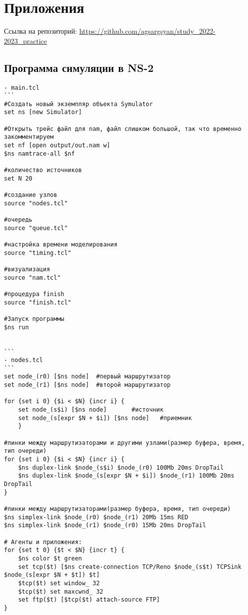 \chapter*{Приложения}

Ссылка на репозиторий: 
\url{https://github.com/agsargsyan/study_2022-2023_practice}


\section*{Программа симуляции в NS-2}

\begin{verbatim}
- main.tcl
```
#Создать новый экземпляр объекта Symulator
set ns [new Simulator]

#Открыть трейс файл для nam, файл слишком большой, так что временно закомментируем
set nf [open output/out.nam w]
$ns namtrace-all $nf

#количество источников 
set N 20

#создание узлов
source "nodes.tcl"

#очередь		
source "queue.tcl"

#настройка времени моделирования  		
source "timing.tcl" 		

#визуализация
source "nam.tcl"   		

#процедура finish
source "finish.tcl"                                                                         

#Запуск программы
$ns run

 
```
- nodes.tcl
```
set node_(r0) [$ns node]  #первый маршрутизатор
set node_(r1) [$ns node]  #второй маршрутизатор	

for {set i 0} {$i < $N} {incr i} {
	set node_(s$i) [$ns node] 		#источник
	set node_(s[expr $N + $i]) [$ns node]	#приемник
	}

#линки между маршрутизаторами и другими узлами(размер буфера, время, тип очереди)
for {set i 0} {$i < $N} {incr i} {
	$ns duplex-link $node_(s$i) $node_(r0) 100Mb 20ms DropTail
	$ns duplex-link $node_(s[expr $N + $i]) $node_(r1) 100Mb 20ms DropTail
}

#линки между маршрутизаторами(размер буфера, время, тип очереди)
$ns simplex-link $node_(r0) $node_(r1) 20Mb 15ms RED
$ns simplex-link $node_(r1) $node_(r0) 15Mb 20ms DropTail

# Агенты и приложения:
for {set t 0} {$t < $N} {incr t} {
	$ns color $t green
	set tcp($t) [$ns create-connection TCP/Reno $node_(s$t) TCPSink $node_(s[expr $N + $t]) $t]
	$tcp($t) set window_ 32
	$tcp($t) set maxcwnd_ 32
	set ftp($t) [$tcp($t) attach-source FTP]
}


\end{verbatim}
